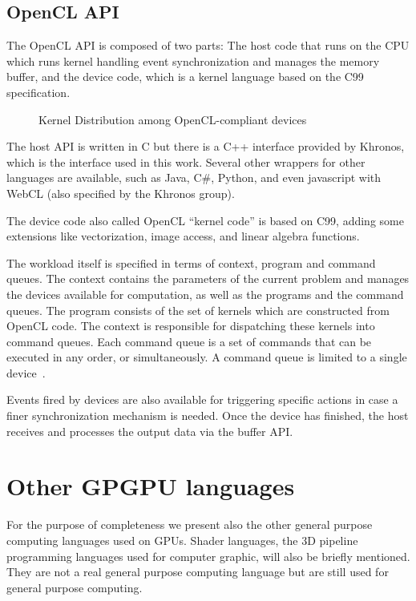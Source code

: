 \subsection{OpenCL API}

The \gls{OpenCL} \gls{API} is composed of two parts: The host code that runs on the CPU which runs kernel handling event synchronization and manages the memory buffer, and the device code, which is a kernel language based on the C99 specification.

\begin{figure}[H]
\caption{Kernel Distribution among OpenCL-compliant devices}
\centering
\end{figure}

The host \gls{API} is written in C but there is a C++ interface provided by Khronos, which is the interface used in this work. Several other wrappers for other languages are available, such as Java, C\#, Python, and even javascript with WebCL (also specified by the Khronos group). 

The device code also called \gls{OpenCL} ``kernel code'' is based on C99, adding some extensions like vectorization, image access, and linear algebra functions.

The workload itself is specified in terms of context, program and command queues. The context contains the parameters of the current problem and manages the devices available for computation, as well as the programs and the command queues. The program consists of the set of kernels which are constructed from \gls{OpenCL} code. The context is responsible for dispatching these kernels into command queues. Each command queue is a set of commands that can be executed in any order, or simultaneously. A command queue is limited to a single device~\cite{OpenCLInAction,OpenCLProgrammingGuide}.

Events fired by devices are also available for triggering specific actions in case a finer synchronization mechanism is needed. Once the device has finished, the host receives and processes the output data via the buffer \gls{API}.

\section{Other GPGPU languages}

For the purpose of completeness we present also the other general purpose computing languages used on \glspl{GPU}. Shader languages, the 3D pipeline programming languages used for computer graphic, will also be briefly mentioned. They are not a real general purpose computing language but are still used for general purpose computing.

